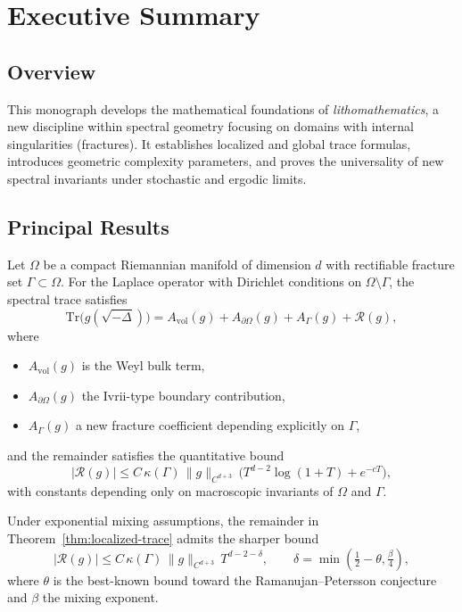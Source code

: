 \chapter*{Executive Summary}
\label{chap:executive-summary}

\section*{Overview}

This monograph develops the mathematical foundations of 
\emph{lithomathematics}, a new discipline within spectral geometry 
focusing on domains with internal singularities (fractures).  
It establishes localized and global trace formulas, introduces 
geometric complexity parameters, and proves the universality of 
new spectral invariants under stochastic and ergodic limits.  

\section*{Principal Results}

\begin{theorem}
\label{thm:localized-trace}
Let $\Omega$ be a compact Riemannian manifold of dimension $d$ 
with rectifiable fracture set $\Gamma \subset \Omega$. 
For the Laplace operator with Dirichlet conditions on $\Omega\setminus\Gamma$, 
the spectral trace satisfies
\[
\mathrm{Tr}\big(g(\sqrt{-\Delta})\big) 
= A_{\mathrm{vol}}(g) + A_{\partial\Omega}(g) + A_{\Gamma}(g) + \mathcal{R}(g),
\]
where
\begin{itemize}
    \item $A_{\mathrm{vol}}(g)$ is the Weyl bulk term, 
    \item $A_{\partial\Omega}(g)$ the Ivrii-type boundary contribution,
    \item $A_{\Gamma}(g)$ a new fracture coefficient depending explicitly on $\Gamma$,
\end{itemize}
and the remainder satisfies the quantitative bound
\[
|\mathcal{R}(g)| \leq C \, \kappa(\Gamma)\, \|g\|_{C^{d+3}}\, 
\big( T^{d-2}\log(1+T) + e^{-cT} \big),
\]
with constants depending only on macroscopic invariants of $\Omega$ and $\Gamma$.
\end{theorem}

\begin{theorem}
\label{thm:power-saving}
Under exponential mixing assumptions, the remainder in Theorem~\ref{thm:localized-trace} 
admits the sharper bound
\[
|\mathcal{R}(g)| \leq C \, \kappa(\Gamma)\, \|g\|_{C^{d+3}}\, T^{d-2-\delta},
\qquad 
\delta = \min\!\left(\tfrac{1}{2}-\theta, \tfrac{\beta}{4}\right),
\]
where $\theta$ is the best-known bound toward the Ramanujan–Petersson conjecture 
and $\beta$ the mixing exponent.
\end{theorem}

